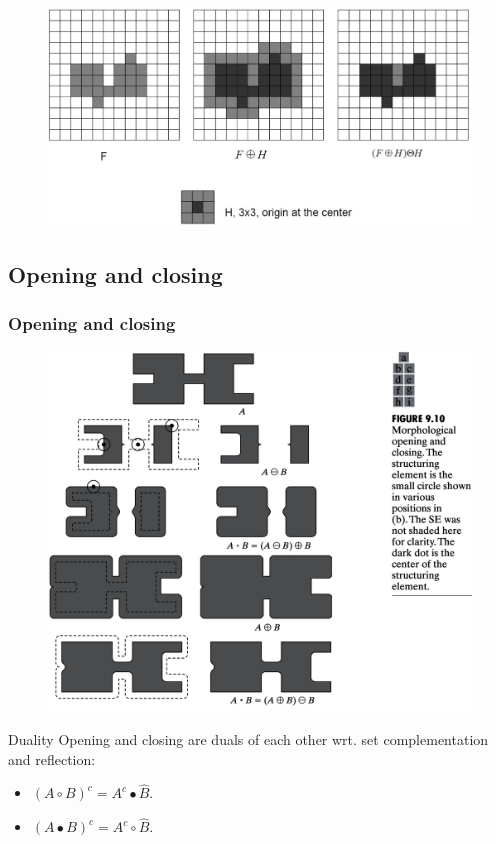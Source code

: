 \begin{frame}
\begin{figure}[!h]
\includegraphics[width=\textwidth]{closing-ex-2.png}
\end{figure}
\end{frame}

\subsection{Opening and closing}

\begin{frame}
\frametitle{Opening and closing}
\begin{figure}[!h]
\includegraphics[width=.7\textwidth]{fig-9-10.png}
\end{figure}
\end{frame}

\begin{frame}
\begin{block}{Duality}
Opening and closing are duals of each other wrt. set complementation and reflection:
\begin{itemize}
\item $\left (A \circ B\right )^{c} = A^{c} \bullet \hat{B}$.
\item $\left ( A \bullet B \right )^{c} = A^{c} \circ \hat{B}$.
\end{itemize}
\end{block}
\end{frame}

